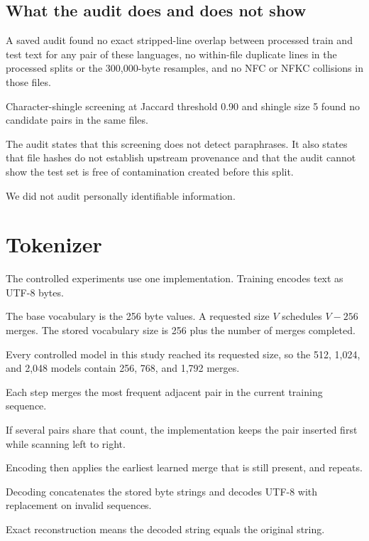 \documentclass[10pt,twocolumn]{article}
\begin{document}
\subsection{What the audit does and does not show}

A saved audit found no exact stripped-line overlap between
processed train and test text for any pair of these languages,
no within-file duplicate lines in the processed splits or
the 300,000-byte resamples, and no NFC or NFKC collisions
in those files.

Character-shingle screening at Jaccard threshold 0.90
and shingle size 5 found no candidate pairs in the same
files.

The audit states that this screening does not detect
paraphrases. It also states that file hashes do not
establish upstream provenance and that the audit cannot
show the test set is free of contamination created before
this split.

We did not audit personally identifiable information.


\section{Tokenizer}

The controlled experiments use one implementation.
Training encodes text as UTF-8 bytes.

The base vocabulary is the 256 byte values.
A requested size $V$ schedules $V-256$ merges.
The stored vocabulary size is 256 plus the number of
merges completed.

Every controlled model in this study reached its
requested size, so the 512, 1,024, and 2,048 models
contain 256, 768, and 1,792 merges.

Each step merges the most frequent adjacent pair in
the current training sequence.

If several pairs share that count, the implementation
keeps the pair inserted first while scanning left to right.

Encoding then applies the earliest learned merge that
is still present, and repeats.

Decoding concatenates the stored byte strings and
decodes UTF-8 with replacement on invalid sequences.

Exact reconstruction means the decoded string equals
the original string.
\end{document}
